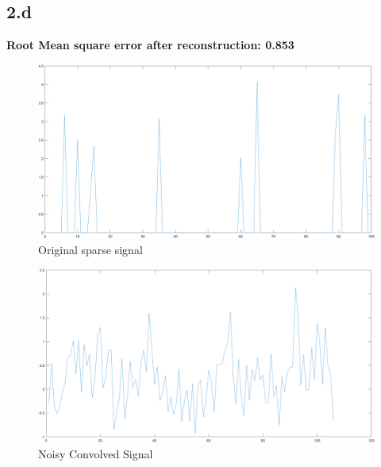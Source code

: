 \documentclass[12pt]{article}
\begin{document}
\subsection*{2.d}
\textbf{Root Mean square error after reconstruction: 0.853}\\
\begin{figure}[H]
  \centering
  \includegraphics[scale=0.35]{orig_signal.png}  %
  \caption{Original sparse signal}
  \label{fig:5}
\end{figure}
\begin{figure}[H]
  \centering
  \includegraphics[scale=0.35]{noisy_conv_signal.png}  %
  \caption{Noisy Convolved Signal}
  \label{fig:6}
\end{figure}
\end{document}
